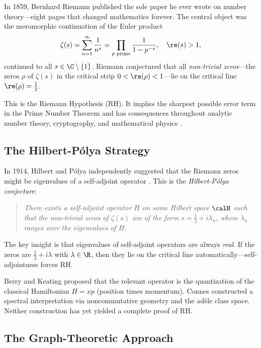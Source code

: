\documentclass[12pt, a4paper]{article}
\theoremstyle{plain}
\theoremstyle{definition}
\begin{document}
In 1859, Bernhard Riemann \citep{Riemann1859} published the sole paper he ever
wrote on number theory---eight pages that changed mathematics forever. The central
object was the meromorphic continuation of the Euler product
\begin{equation}\label{eq:zeta}
  \zeta(s) = \sum_{n=1}^\infty \frac{1}{n^s} = \prod_{p \text{ prime}} \frac{1}{1-p^{-s}},
  \quad \re(s) > 1,
\end{equation}
continued to all $s \in \C \setminus \{1\}$. Riemann conjectured that all
\emph{non-trivial zeros}---the zeros $\rho$ of $\zeta(s)$ in the critical strip
$0 < \re(\rho) < 1$---lie on the critical line $\re(\rho) = \frac{1}{2}$.

This is the Riemann Hypothesis (RH). It implies the sharpest possible error term
in the Prime Number Theorem and has consequences throughout analytic number theory,
cryptography, and mathematical physics \citep{IwaniecKowalski2004, Bombieri2000}.

\subsection{The Hilbert-P\'olya Strategy}

In 1914, Hilbert and P\'olya independently suggested that the Riemann zeros might
be eigenvalues of a self-adjoint operator \citep{HilbertPolya}. This is the
\emph{Hilbert-P\'olya conjecture}:

\begin{quote}
  \emph{There exists a self-adjoint operator $H$ on some Hilbert space $\calH$
  such that the non-trivial zeros of $\zeta(s)$ are of the form
  $s = \frac{1}{2} + i\lambda_n$, where $\lambda_n$ ranges over the
  eigenvalues of $H$.}
\end{quote}

The key insight is that eigenvalues of self-adjoint operators are always
\emph{real}. If the zeros are $\frac{1}{2} + i\lambda$ with $\lambda \in \R$,
then they lie on the critical line automatically---self-adjointness forces RH.

Berry and Keating \citep{BerryKeating1999} proposed that the relevant operator
is the quantization of the classical Hamiltonian $H = xp$ (position times momentum).
Connes \citep{Connes1999} constructed a spectral interpretation via noncommutative
geometry and the ad\`ele class space. Neither construction has yet yielded a
complete proof of RH.

\subsection{The Graph-Theoretic Approach}
\end{document}
